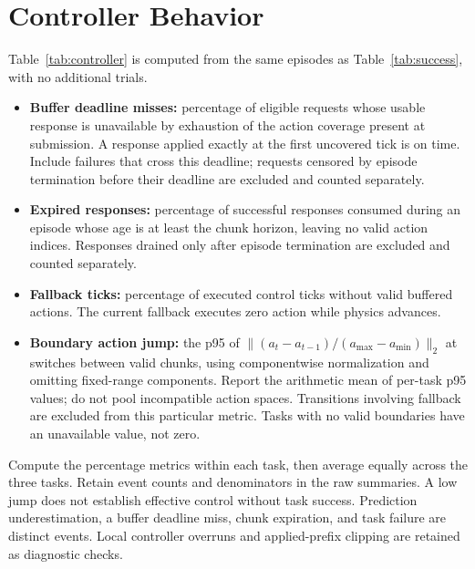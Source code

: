 \documentclass[11pt]{article}
\begin{document}
\section{Controller Behavior}
Table~\ref{tab:controller} is computed from the same episodes as Table~\ref{tab:success}, with no additional trials.
\begin{itemize}
\item \textbf{Buffer deadline misses:} percentage of eligible requests whose usable response is unavailable by exhaustion of the action coverage present at submission. A response applied exactly at the first uncovered tick is on time. Include failures that cross this deadline; requests censored by episode termination before their deadline are excluded and counted separately.
\item \textbf{Expired responses:} percentage of successful responses consumed during an episode whose age is at least the chunk horizon, leaving no valid action indices. Responses drained only after episode termination are excluded and counted separately.
\item \textbf{Fallback ticks:} percentage of executed control ticks without valid buffered actions. The current fallback executes zero action while physics advances.
\item \textbf{Boundary action jump:} the p95 of $\| (a_t-a_{t-1})/(a_{\max}-a_{\min})\|_2$ at switches between valid chunks, using componentwise normalization and omitting fixed-range components. Report the arithmetic mean of per-task p95 values; do not pool incompatible action spaces. Transitions involving fallback are excluded from this particular metric. Tasks with no valid boundaries have an unavailable value, not zero.
\end{itemize}
Compute the percentage metrics within each task, then average equally across the three tasks. Retain event counts and denominators in the raw summaries. A low jump does not establish effective control without task success. Prediction underestimation, a buffer deadline miss, chunk expiration, and task failure are distinct events. Local controller overruns and applied-prefix clipping are retained as diagnostic checks.
\end{document}
